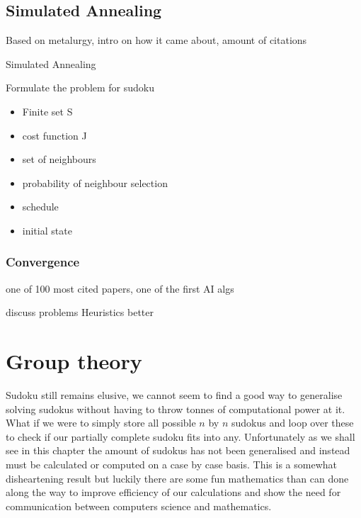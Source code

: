 \documentclass[a4paper,11pt]{report}
\newcounter{row}
\begin{document}
\section{Simulated Annealing} 

Based on metalurgy, intro on how it  came about, amount of citations

\begin{algorithm}
\caption{Simulated Annealing}
\begin{algorithmic}
		\Else
			\EndIf
		\EndIf
	\EndFor
\EndProcedure
\end{algorithmic}
\end{algorithm}

Formulate the problem for sudoku
\begin{itemize}
\item Finite set S
\item cost function J
\item set of neighbours
\item probability of neighbour selection
\item schedule
\item initial state
\end{itemize}

\subsection{Convergence}
\cite{simulatedannealing} one of 100 most cited papers, one of the first AI algs

discuss problems 
Heuristics better



\chapter{Group theory}

Sudoku still remains elusive, we cannot seem to find a good way to generalise solving sudokus without having to throw tonnes of computational power at it. What if we were to simply store all possible $n$ by $n$ sudokus and loop over these to check if our partially complete sudoku fits into any. Unfortunately as we shall see in this chapter the amount of sudokus has not been generalised and instead must be calculated or computed on a case by case basis. This is a somewhat disheartening result but luckily there are some fun mathematics than can done along the way to improve efficiency of our calculations and show the need for communication between computers science and mathematics.
\end{document}
